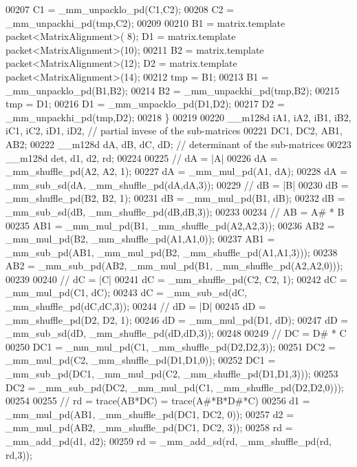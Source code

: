 \begin{DoxyCode}
00207       C1 = \_mm\_unpacklo\_pd(C1,C2);
00208       C2 = \_mm\_unpackhi\_pd(tmp,C2);
00209       
00210       B1 = matrix.template packet<MatrixAlignment>( 8); D1 = matrix.template packet<MatrixAlignment>(10);
00211       B2 = matrix.template packet<MatrixAlignment>(12); D2 = matrix.template packet<MatrixAlignment>(14);
00212       tmp = B1;
00213       B1 = \_mm\_unpacklo\_pd(B1,B2);
00214       B2 = \_mm\_unpackhi\_pd(tmp,B2);
00215       tmp = D1;
00216       D1 = \_mm\_unpacklo\_pd(D1,D2);
00217       D2 = \_mm\_unpackhi\_pd(tmp,D2);
00218     \}
00219     
00220     \_\_m128d iA1, iA2, iB1, iB2, iC1, iC2, iD1, iD2,     \textcolor{comment}{// partial invese of the sub-matrices}
00221             DC1, DC2, AB1, AB2;
00222     \_\_m128d dA, dB, dC, dD;     \textcolor{comment}{// determinant of the sub-matrices}
00223     \_\_m128d det, d1, d2, rd;
00224 
00225     \textcolor{comment}{//  dA = |A|}
00226     dA = \_mm\_shuffle\_pd(A2, A2, 1);
00227     dA = \_mm\_mul\_pd(A1, dA);
00228     dA = \_mm\_sub\_sd(dA, \_mm\_shuffle\_pd(dA,dA,3));
00229     \textcolor{comment}{//  dB = |B|}
00230     dB = \_mm\_shuffle\_pd(B2, B2, 1);
00231     dB = \_mm\_mul\_pd(B1, dB);
00232     dB = \_mm\_sub\_sd(dB, \_mm\_shuffle\_pd(dB,dB,3));
00233 
00234     \textcolor{comment}{//  AB = A# * B}
00235     AB1 = \_mm\_mul\_pd(B1, \_mm\_shuffle\_pd(A2,A2,3));
00236     AB2 = \_mm\_mul\_pd(B2, \_mm\_shuffle\_pd(A1,A1,0));
00237     AB1 = \_mm\_sub\_pd(AB1, \_mm\_mul\_pd(B2, \_mm\_shuffle\_pd(A1,A1,3)));
00238     AB2 = \_mm\_sub\_pd(AB2, \_mm\_mul\_pd(B1, \_mm\_shuffle\_pd(A2,A2,0)));
00239 
00240     \textcolor{comment}{//  dC = |C|}
00241     dC = \_mm\_shuffle\_pd(C2, C2, 1);
00242     dC = \_mm\_mul\_pd(C1, dC);
00243     dC = \_mm\_sub\_sd(dC, \_mm\_shuffle\_pd(dC,dC,3));
00244     \textcolor{comment}{//  dD = |D|}
00245     dD = \_mm\_shuffle\_pd(D2, D2, 1);
00246     dD = \_mm\_mul\_pd(D1, dD);
00247     dD = \_mm\_sub\_sd(dD, \_mm\_shuffle\_pd(dD,dD,3));
00248 
00249     \textcolor{comment}{//  DC = D# * C}
00250     DC1 = \_mm\_mul\_pd(C1, \_mm\_shuffle\_pd(D2,D2,3));
00251     DC2 = \_mm\_mul\_pd(C2, \_mm\_shuffle\_pd(D1,D1,0));
00252     DC1 = \_mm\_sub\_pd(DC1, \_mm\_mul\_pd(C2, \_mm\_shuffle\_pd(D1,D1,3)));
00253     DC2 = \_mm\_sub\_pd(DC2, \_mm\_mul\_pd(C1, \_mm\_shuffle\_pd(D2,D2,0)));
00254 
00255     \textcolor{comment}{//  rd = trace(AB*DC) = trace(A#*B*D#*C)}
00256     d1 = \_mm\_mul\_pd(AB1, \_mm\_shuffle\_pd(DC1, DC2, 0));
00257     d2 = \_mm\_mul\_pd(AB2, \_mm\_shuffle\_pd(DC1, DC2, 3));
00258     rd = \_mm\_add\_pd(d1, d2);
00259     rd = \_mm\_add\_sd(rd, \_mm\_shuffle\_pd(rd, rd,3));

\end{DoxyCode}
